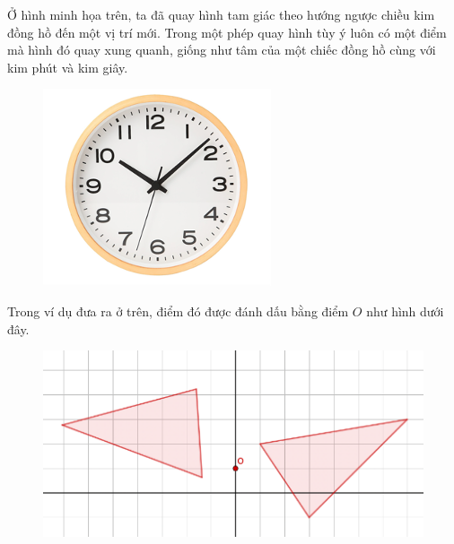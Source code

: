 \begin{multicols}{2}
\begin{figure}[H]
		\vspace*{-10pt}
	\end{figure}
	Ở hình minh họa trên, ta đã quay hình tam giác theo hướng ngược chiều kim đồng hồ đến một vị trí mới. Trong một phép quay hình tùy ý luôn có một điểm mà hình đó quay xung quanh, giống như tâm của một chiếc đồng hồ cùng với kim phút và kim giây.
	\begin{figure}[H]
		\vspace*{-5pt}
		\centering
		\captionsetup{labelformat= empty, justification=centering}
		\includegraphics[width= 1\linewidth]{Picture18}
		\vspace*{-10pt}
	\end{figure}
	Trong ví dụ đưa ra ở trên, điểm đó được đánh dấu bằng điểm $O$ như hình dưới đây.
	\begin{figure}[H]
		\vspace*{-5pt}
		\centering
		\captionsetup{labelformat= empty, justification=centering}
		\includegraphics[width= 1\linewidth]{Picture19}

\end{figure}
\end{multicols}
